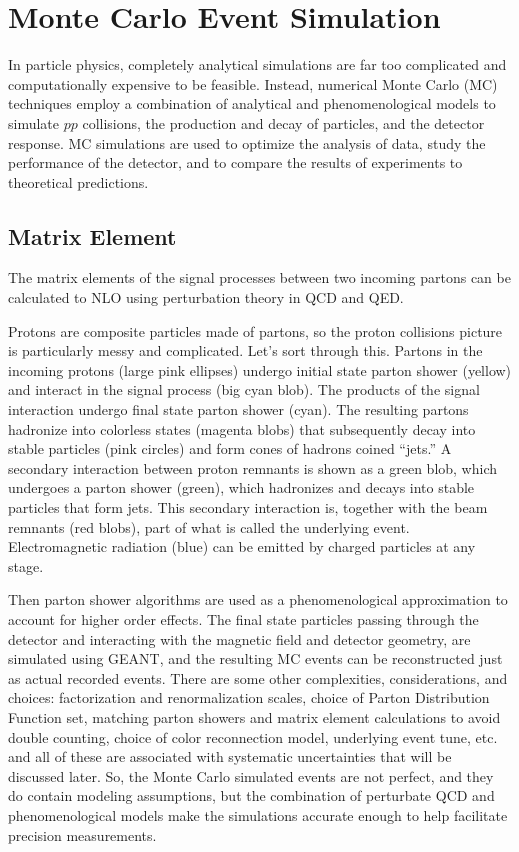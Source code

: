 
\chapter{Monte Carlo Event Simulation}
In particle physics, completely analytical simulations are far too complicated and computationally expensive to be feasible.
Instead, numerical Monte Carlo (MC) techniques employ a combination of analytical and phenomenological models to simulate $pp$ collisions, the production and decay of particles, and the detector response.
MC simulations are used to optimize the analysis of data, study the performance of the detector, and to compare the results of experiments to theoretical predictions.

\section{Matrix Element}
The matrix elements of the signal processes between two incoming partons can be calculated to NLO using perturbation theory in QCD and QED.





Protons are composite particles made of partons, so the proton collisions picture is
particularly messy and complicated. Let’s sort through this.
Partons in the incoming protons (large pink ellipses) undergo initial state parton
shower (yellow) and interact in the signal process (big cyan blob).
The products of the signal interaction undergo final state parton shower (cyan). The
resulting partons hadronize into colorless states (magenta blobs) that subsequently
decay into stable particles (pink circles) and form cones of hadrons coined “jets.”
A secondary interaction between proton remnants is shown as a green blob, which
undergoes a parton shower (green), which hadronizes and decays into stable
particles that form jets. This secondary interaction is, together with the beam
remnants (red blobs), part of what is called the underlying event.
Electromagnetic radiation (blue) can be emitted by charged particles at any stage.


Then parton shower algorithms are used as a phenomenological approximation to account for higher order effects.
The final state particles passing through the detector and interacting with the magnetic field and detector geometry, are simulated using GEANT, and the resulting MC events can be reconstructed just as actual recorded events.
There are some other complexities, considerations, and choices: factorization and
renormalization scales, choice of Parton Distribution Function set, matching parton
showers and matrix element calculations to avoid double counting, choice of color
reconnection model, underlying event tune, etc. and all of these are associated with
systematic uncertainties that will be discussed later.
So, the Monte Carlo simulated events are not perfect, and they do contain modeling
assumptions, but the combination of perturbate QCD and phenomenological models
make the simulations accurate enough to help facilitate precision measurements.





